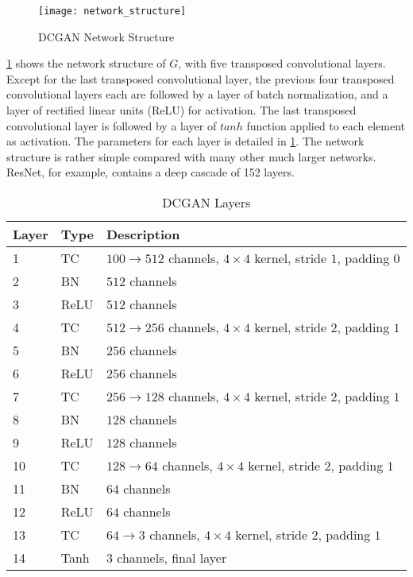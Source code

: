 \begin{figure}[h]
  \centering
  \texttt{[image: network\_structure]}
  \caption{DCGAN Network Structure}
  \label{fig:network_structure}
\end{figure}


\ref{fig:network_structure} shows the network structure of $G$, with five transposed convolutional layers.
Except for the last transposed convolutional layer, the previous four transposed convolutional layers each
are followed by a layer of batch normalization, and a layer of rectified linear units (ReLU) for
activation. The last transposed convolutional layer is followed by a layer of $tanh$ function applied to
each element as activation. The parameters for each layer is detailed in \ref{table:network_layers}.
The network structure is rather simple compared with many other much larger networks. ResNet, for example,
contains a deep cascade of 152 layers.

\begin{table}[h]
  \centering
  \caption{DCGAN Layers}
  \begin{tabular}{l | l | l }
    \toprule
    Layer & Type & Description \\
    \midrule
    1 & TC & $100 \rightarrow 512$ channels, $4 \times 4$ kernel, stride $1$, padding $0$ \\
    2 & BN & $512$ channels\\
    3 & ReLU & $512$ channels \\
    4 & TC & $512 \rightarrow 256$ channels, $4 \times 4$ kernel, stride $2$, padding $1$ \\
    5 & BN & $256$ channels \\
    6 & ReLU & $256$ channels \\
    7 & TC & $256 \rightarrow 128$ channels, $4 \times 4$ kernel, stride $2$, padding $1$ \\
    8 & BN & $128$ channels \\
    9 & ReLU & $128$ channels \\
    10 & TC & $128 \rightarrow 64$ channels, $4 \times 4$ kernel, stride $2$, padding $1$ \\
    11 & BN & $64$ channels \\
    12 & ReLU & $64$ channels \\
    13 & TC & $64 \rightarrow 3$ channels, $4 \times 4$ kernel, stride $2$, padding $1$ \\
    14 & Tanh & 3 channels, final layer \\
    \bottomrule
  \end{tabular}
  \label{table:network_layers}
\end{table}

